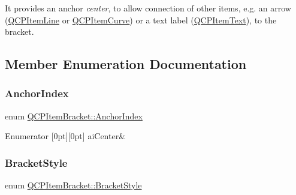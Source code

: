 It provides an anchor {\itshape center}, to allow connection of other items, e.\+g. an arrow (\mbox{\hyperlink{class_q_c_p_item_line}{Q\+C\+P\+Item\+Line}} or \mbox{\hyperlink{class_q_c_p_item_curve}{Q\+C\+P\+Item\+Curve}}) or a text label (\mbox{\hyperlink{class_q_c_p_item_text}{Q\+C\+P\+Item\+Text}}), to the bracket. 

\subsection{Member Enumeration Documentation}
\mbox{\label{class_q_c_p_item_bracket_a7f3a6a56d67f71219ed220553f3dd861}} 
\subsubsection{\texorpdfstring{AnchorIndex}{AnchorIndex}}
{\footnotesize\ttfamily enum \mbox{\hyperlink{class_q_c_p_item_bracket_a7f3a6a56d67f71219ed220553f3dd861}{Q\+C\+P\+Item\+Bracket\+::\+Anchor\+Index}}\hspace{0.3cm}{\ttfamily [protected]}}

\begin{DoxyEnumFields}{Enumerator}
[0pt][0pt]{}\mbox{\label{class_q_c_p_item_bracket_a7f3a6a56d67f71219ed220553f3dd861a17b57ef34cc05eadfe9becd1ad5b5242}} 
ai\+Center&\\
\hline

\end{DoxyEnumFields}
\mbox{\label{class_q_c_p_item_bracket_a7ac3afd0b24a607054e7212047d59dbd}} 
\subsubsection{\texorpdfstring{BracketStyle}{BracketStyle}}
{\footnotesize\ttfamily enum \mbox{\hyperlink{class_q_c_p_item_bracket_a7ac3afd0b24a607054e7212047d59dbd}{Q\+C\+P\+Item\+Bracket\+::\+Bracket\+Style}}}

